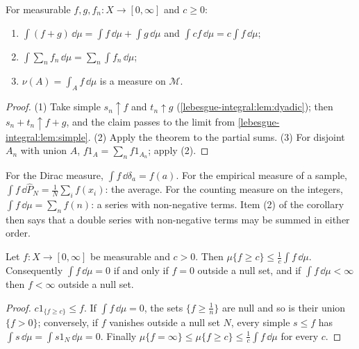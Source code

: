 \begin{notechapter}
\begin{corollary}\label{lebesgue-integral:cor:additive}
For measurable $f, g, f_n:X\to[0, \infty]$ and $c\geq0$:
\begin{enumerate}[nosep]
  \item $\int(f + g)\,\dd\mu = \int f\,\dd\mu + \int g\,\dd\mu$ and
        $\int cf\,\dd\mu = c\int f\,\dd\mu$;
  \item $\int\sum_nf_n\,\dd\mu = \sum_n\int f_n\,\dd\mu$;
  \item $\nu(A) = \int_Af\,\dd\mu$ is a measure on $\mathcal M$.
\end{enumerate}
\end{corollary}

\begin{proof}
(1) Take simple $s_n\uparrow f$ and $t_n\uparrow g$
(\cref{lebesgue-integral:lem:dyadic}); then $s_n + t_n\uparrow f + g$,
and the claim passes to the limit from
\cref{lebesgue-integral:lem:simple}. (2) Apply the theorem to the
partial sums. (3) For disjoint $A_n$ with union $A$,
$f1_A = \sum_nf1_{A_n}$; apply (2).
\end{proof}

\begin{example}\label{lebesgue-integral:ex:sums}
For the Dirac measure, $\int f\,\dd\delta_a = f(a)$. For the empirical
measure of a sample, $\int f\,\dd\hat P_N = \frac1N\sum_if(x_i)$: the
average. For the counting measure on the integers,
$\int f\,\dd\mu = \sum_nf(n)$: a series with non-negative terms. Item
(2) of the corollary then says that a double series with non-negative
terms may be summed in either order.
\end{example}

\begin{proposition}\label{lebesgue-integral:prop:markov}
Let $f:X\to[0, \infty]$ be measurable and $c > 0$. Then
$\mu\{f\geq c\}\leq\frac1c\int f\,\dd\mu$. Consequently
$\int f\,\dd\mu = 0$ if and only if $f = 0$ outside a null set, and if
$\int f\,\dd\mu < \infty$ then $f < \infty$ outside a null set.
\end{proposition}

\begin{proof}
$c1_{\{f\geq c\}}\leq f$. If $\int f\,\dd\mu = 0$, the sets
$\{f\geq\frac1n\}$ are null and so is their union $\{f > 0\}$;
conversely, if $f$ vanishes outside a null set $N$, every simple
$s\leq f$ has $\int s\,\dd\mu = \int s1_N\,\dd\mu = 0$. Finally
$\mu\{f = \infty\}\leq\mu\{f\geq c\}\leq\frac1c\int f\,\dd\mu$ for every
$c$.
\end{proof}


\end{notechapter}
